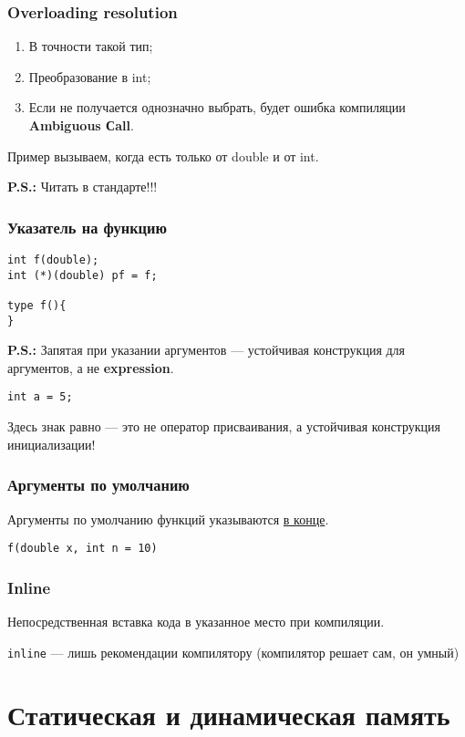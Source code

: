 \documentclass[12pt]{article}
\newcommand{\ps}{\textbf{P.S.: }}
\begin{document}
\subsubsection{Overloading resolution}
\begin{enumerate}
	\item В точности такой тип;
	\item Преобразование в int;
	\item Если не получается однозначно выбрать, будет ошибка компиляции \textbf{Ambiguous Сall}.
\end{enumerate}

Пример  вызываем, когда есть только от double и от int. 

\ps Читать в стандарте!!!

\subsubsection{Указатель на функцию}

\begin{lstlisting}
int f(double);
int (*)(double) pf = f;

type f(){
}
\end{lstlisting}

\ps Запятая при указании аргументов --- устойчивая конструкция для аргументов, а не \textbf{expression}. 

\texttt{int a = 5;} 

Здесь знак равно --- это не оператор присваивания, а устойчивая конструкция инициализации!

\subsubsection{Аргументы по умолчанию}

Аргументы по умолчанию функций указываются \underline{в конце}. 

\texttt{f(double x, int n = 10)}

\subsubsection{Inline}

Непосредственная вставка кода в указанное место при компиляции. 

\texttt{inline} --- лишь рекомендации компилятору (компилятор решает сам, он умный)


\section[Память]{Статическая и динамическая память}
\end{document}
